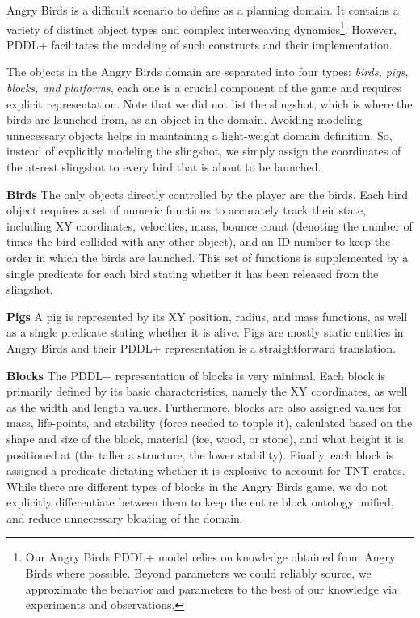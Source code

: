 Angry Birds is a difficult scenario to define as a planning domain. It contains a variety of distinct object types and complex interweaving dynamics\footnote{Our Angry Birds PDDL+ model relies on knowledge obtained from Angry Birds where possible. Beyond parameters we could reliably source, we approximate the behavior and parameters to the best of our knowledge via experiments and observations.}. However, PDDL+ facilitates the modeling of such constructs and their implementation.

The objects in the Angry Birds domain are separated into four types: \textit{birds, pigs, blocks, and platforms}, each one is a crucial component of the game and requires explicit representation. Note that we did not list the slingshot, which is where the birds are launched from, as an object in the domain. 
Avoiding modeling unnecessary objects helps in maintaining a light-weight domain definition. 
So, instead of explicitly modeling the slingshot, we simply assign the coordinates of the at-rest slingshot to every bird that is about to be launched.

\noindent\textbf{Birds} The only objects directly controlled by the player are the birds. Each bird object requires a set of numeric functions to accurately track their state, including XY coordinates, velocities, mass, bounce count (denoting the number of times the bird collided with any other object), and an ID number to keep the order in which the birds are launched. This set of functions is supplemented by a single predicate for each bird stating whether it has been released from the slingshot. 

\noindent\textbf{Pigs} %
A pig is represented by its XY position, radius, and mass functions, as well as a single predicate stating whether it is alive. Pigs are mostly static entities in Angry Birds and their PDDL+ representation is a straightforward translation.

\noindent\textbf{Blocks} The PDDL+ representation of blocks is very minimal. Each block is primarily defined by its basic characteristics, namely the XY coordinates, as well as the width and length values. Furthermore, blocks are also assigned values for mass, life-points, and stability (force needed to topple it), calculated based on the shape and size of the block, material (ice, wood, or stone), and what height it is positioned at (the taller a structure, the lower stability). Finally, each block is assigned a predicate dictating whether it is explosive to account for TNT crates. While there are different types of blocks in the Angry Birds game, we do not explicitly differentiate between them to keep the entire block ontology unified, and reduce unnecessary bloating of the domain. 

